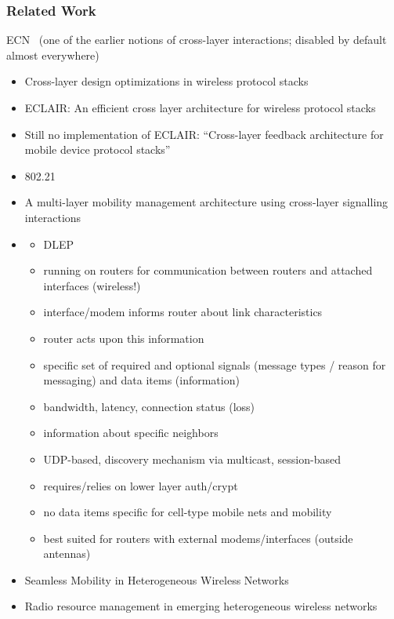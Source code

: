 \subsubsection{Related Work}

 ECN~\cite{rfc3168} (one of the earlier notions of cross-layer interactions; disabled by default almost everywhere)

\begin{itemize}
	\item Cross-layer design optimizations in wireless protocol stacks \cite{Raisinghani2004720}
	\item ECLAIR: An efficient cross layer architecture for wireless protocol stacks \cite{raisinghani2004eclair}
	\item Still no implementation of ECLAIR: ``Cross-layer feedback architecture for mobile device protocol stacks'' \cite{1580937}
	\item 802.21
	\item A multi-layer mobility management architecture using cross-layer signalling interactions\cite{wang2003multi}
	\item 
		\begin{itemize}
			\item \gls{DLEP} \cite{ietf2013dlepdraft}
			\item running on routers for communication between routers and attached interfaces (wireless!)
			\item interface/modem informs router about link characteristics
			\item router acts upon this information
			\item specific set of required and optional signals (message types / reason for messaging) and data items (information)
			\item bandwidth, latency, connection status (loss)
			\item information about specific neighbors
			\item \gls{UDP}-based, discovery mechanism via multicast, session-based
			\item requires/relies on lower layer auth/crypt
			\item no data items specific for cell-type mobile nets and mobility
			\item best suited for routers with external modems/interfaces (outside antennas)
		\end{itemize}
	\item Seamless Mobility in Heterogeneous Wireless Networks \cite{zarai2010seamless}
	\item Radio resource management in emerging heterogeneous wireless networks \cite{Piamrat20111066}

\end{itemize}
